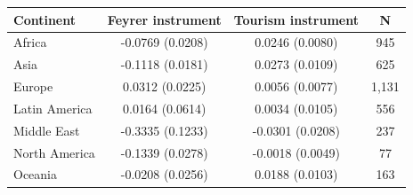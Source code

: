\begin{tabular}{lccc}
\toprule
Continent & Feyrer instrument & Tourism instrument & N \\
\midrule
Africa & -0.0769\sym{***} (0.0208) & 0.0246\sym{***} (0.0080) & 945 \\
Asia & -0.1118\sym{***} (0.0181) & 0.0273\sym{**} (0.0109) & 625 \\
Europe & 0.0312 (0.0225) & 0.0056 (0.0077) & 1,131 \\
Latin America & 0.0164 (0.0614) & 0.0034 (0.0105) & 556 \\
Middle East & -0.3335\sym{***} (0.1233) & -0.0301 (0.0208) & 237 \\
North America & -0.1339\sym{***} (0.0278) & -0.0018 (0.0049) & 77 \\
Oceania & -0.0208 (0.0256) & 0.0188\sym{*} (0.0103) & 163 \\
\bottomrule
\end{tabular}
